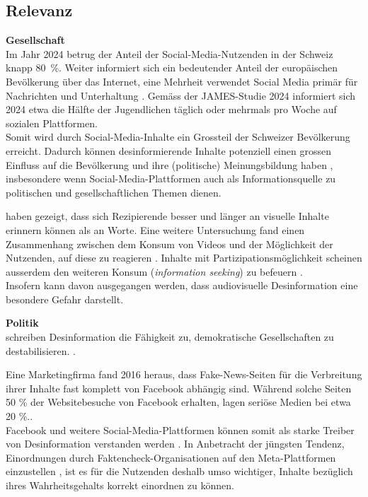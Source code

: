 \documentclass[12pt,a4paper]{article}        %
\begin{document}
\subsection{Relevanz}
\textbf{Gesellschaft} \\
Im Jahr 2024 betrug der Anteil der Social-Media-Nutzenden in der Schweiz knapp 80 \%. Weiter informiert sich ein bedeutender Anteil der europäischen Bevölkerung über das Internet, eine Mehrheit verwendet Social Media primär für Nachrichten und Unterhaltung \parencite[21ff]{we_are_social_anteil_2024}. Gemäss der JAMES-Studie 2024 \parencite[40]{kulling-knecht_james_2024} informiert sich 2024 etwa die Hälfte der Jugendlichen täglich oder mehrmals pro Woche auf sozialen Plattformen. \\
Somit wird durch Social-Media-Inhalte ein Grossteil der Schweizer Bevölkerung erreicht. Dadurch können desinformierende Inhalte potenziell einen grossen Einfluss auf die Bevölkerung und ihre (politische) Meinungsbildung haben \parencites[18]{grujic_warnhinweise_2024}[258]{hohlfeld_schlechte_2020}[1f]{khan_fake_2021}, insbesondere wenn Social-Media-Plattformen auch als Informationsquelle zu politischen und gesellschaftlichen Themen dienen.

\textcite{grady_neural_1998} haben gezeigt, dass sich Rezipierende besser und länger an visuelle Inhalte erinnern können als an Worte. Eine weitere Untersuchung fand einen Zusammenhang zwischen dem Konsum von Videos und der Möglichkeit der Nutzenden, auf diese zu reagieren \parencite[242]{khan_social_2017}. Inhalte mit Partizipationsmöglichkeit scheinen ausserdem den weiteren Konsum (\textit{information seeking}) zu befeuern \parencite[243]{khan_social_2017}. \\
Insofern kann davon ausgegangen werden, dass audiovisuelle Desinformation eine besondere Gefahr darstellt.

\textbf{Politik} \\
\textcite[258]{hohlfeld_schlechte_2020} schreiben Desinformation die Fähigkeit zu, demokratische Gesellschaften  zu destabilisieren. \parencite[vgl.\ auch][1]{khan_fake_2021}.

Eine Marketingfirma fand 2016 heraus, dass Fake-News-Seiten für die Verbreitung ihrer Inhalte fast komplett  von Facebook abhängig sind. Während solche Seiten 50 \% der Websitebesuche von Facebook erhalten, lagen seriöse Medien bei etwa 20 \%.\parencites{wong_almost_2016}[zit.\ nach][1]{khan_fake_2021}[vgl.\ auch][212]{allcott_social_2017}. \\
Facebook und weitere Social-Media-Plattformen können somit als starke Treiber von Desinformation verstanden werden \parencite{wong_almost_2016}. In Anbetracht der jüngsten Tendenz, Einordnungen durch Faktencheck-Organisationen auf den Meta-Plattformen einzustellen \parencites{isaac_meta_2025}{meta_transparency_centre_penalties_2025}, ist es für die Nutzenden deshalb umso wichtiger, Inhalte bezüglich ihres Wahrheitsgehalts korrekt einordnen zu können.
\end{document}
